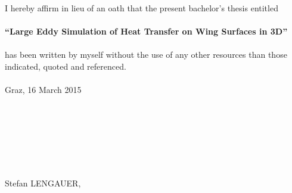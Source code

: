 
I hereby affirm in lieu of an oath that the present bachelor's thesis entitled\\
\\
\textbf{``Large Eddy Simulation of Heat Transfer on Wing Surfaces in 3D''}\\
\\
has been written by myself without the use of any other resources than those indicated, quoted and referenced.\\
\\
Graz, 16 March 2015\\
\\
\\
\\
\\
\\
\\
\\
Stefan LENGAUER,
